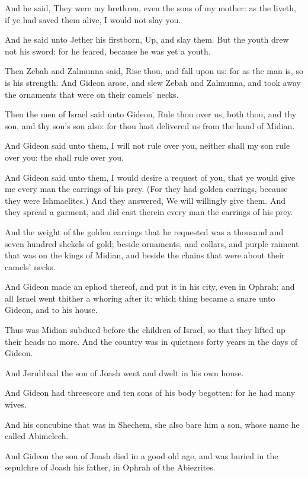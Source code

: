 \verse And he said, They were my brethren, even the sons of my mother: as the \LORD liveth, if ye had saved them alive, I would not slay you.

\verse And he said unto Jether his firstborn, Up, and slay them. But the youth drew not his sword: for he feared, because he was yet a youth.

\verse Then Zebah and Zalmunna said, Rise thou, and fall upon us: for as the man is, so is his strength. And Gideon arose, and slew Zebah and Zalmunna, and took away the ornaments that were on their camels' necks.

\verse Then the men of Israel said unto Gideon, Rule thou over us, both thou, and thy son, and thy son's son also: for thou hast delivered us from the hand of Midian.

\verse And Gideon said unto them, I will not rule over you, neither shall my son rule over you: the \LORD shall rule over you.

\verse And Gideon said unto them, I would desire a request of you, that ye would give me every man the earrings of his prey. (For they had golden earrings, because they were Ishmaelites.)  \verse And they answered, We will willingly give them. And they spread a garment, and did cast therein every man the earrings of his prey.

\verse And the weight of the golden earrings that he requested was a thousand and seven hundred shekels of gold; beside ornaments, and collars, and purple raiment that was on the kings of Midian, and beside the chains that were about their camels' necks.

\verse And Gideon made an ephod thereof, and put it in his city, even in Ophrah: and all Israel went thither a whoring after it: which thing became a snare unto Gideon, and to his house.

\verse Thus was Midian subdued before the children of Israel, so that they lifted up their heads no more. And the country was in quietness forty years in the days of Gideon.

\verse And Jerubbaal the son of Joash went and dwelt in his own house.

\verse And Gideon had threescore and ten sons of his body begotten: for he had many wives.

\verse And his concubine that was in Shechem, she also bare him a son, whose name he called Abimelech.

\verse And Gideon the son of Joash died in a good old age, and was buried in the sepulchre of Joash his father, in Ophrah of the Abiezrites.

